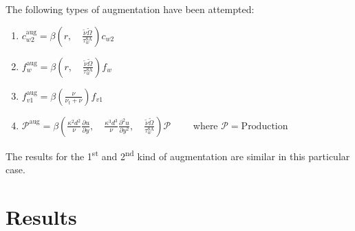 \documentclass{article}
\begin{document}
The following types of augmentation have been attempted:
\begin{enumerate}
    \item $\displaystyle c_{w2}^\text{aug} = \beta\left(r,\quad\frac{\widetilde\nu\widetilde\Omega}{\tau_w^\text{SA}}\right) c_{w2}$
    \item $\displaystyle f_w^\text{aug} = \beta\left(r,\quad\frac{\widetilde\nu\widetilde\Omega}{\tau_w^\text{SA}}\right) f_w$
    \item $\displaystyle f_{v1}^\text{aug} = \beta\left(\frac{\nu}{\nu_t+\nu}\right) f_{v1}$
    \item $\displaystyle \mathcal{P}^\text{aug} = \beta\left(\frac{\kappa^2 d^2}{\nu}\frac{\partial u}{\partial y},\quad
                                                             \frac{\kappa^3 d^3}{\nu}\frac{\partial^2 u}{\partial y^2},\quad
                                                             \frac{\widetilde\nu\widetilde\Omega}{\tau_w^\text{SA}}\right) \mathcal{P}\qquad$ where $\mathcal{P}=\text{Production}$
\end{enumerate}
The results for the 1\textsuperscript{st} and 2\textsuperscript{nd} kind of augmentation are similar in this particular case.
%


\section*{Results}
\end{document}

